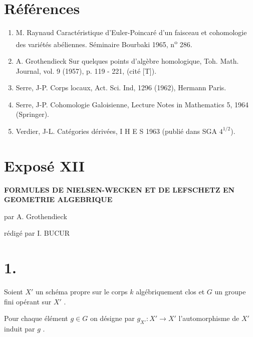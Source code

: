 \documentclass[11pt]{article}
\providecommand{\EP}{\operatorname{EP}}
\providecommand{\Ob}{\operatorname{ob}}
\providecommand{\Ob}{\operatorname{ob}}
\providecommand{\EP}{\operatorname{EP}}
\providecommand{\Ob}{\operatorname{Ob}}
\providecommand{\Ob}{\operatorname{ob}}
\providecommand{\Ob}{\operatorname{Ob}}
\begin{document}
\section*{Références}

\begin{enumerate}
\item[{[1]}] M.
Raynaud Caractéristique d'Euler-Poincaré d'un faisceau et cohomologie des variétés abéliennes. Séminaire Bourbaki 1965, n\textsuperscript{o} 286.
\item[{[2]}] A. Grothendieck Sur quelques points d'algèbre homologique, Toh. Math. Journal, vol. 9 (1957), p. 119 - 221, (cité [T]).
\item[{[3]}] Serre, J-P. Corps locaux, Act. Sci. Ind, 1296 (1962), Hermann Paris.
\item[{[4]}] Serre, J-P. Cohomologie Galoisienne, Lecture Notes in Mathematics 5, 1964 (Springer).
\item[{[5]}] Verdier, J-L. Catégories dérivées, I H E S 1963 (publié dans SGA $4^{1/2}$).
\end{enumerate}

\renewcommand{\EP}{\operatorname{EP}}
\renewcommand{\Ob}{\operatorname{ob}}
\section*{Exposé XII}

\begin{center}
\Large\bf
FORMULES DE NIELSEN-WECKEN ET DE LEFSCHETZ EN GEOMETRIE ALGEBRIQUE
\end{center}

\begin{center}
par A. Grothendieck

rédigé par I. BUCUR
\end{center}

\bigskip

\section*{1.}
Soient $X'$ un schéma propre sur le corps $k$ algébriquement clos et $G$ un groupe fini opérant sur $X'$ .

Pour chaque élément $g \in G$ on désigne par $g_{X'} : X' \to X'$ l'automorphisme de $X'$ induit par $g$ .
\end{document}
